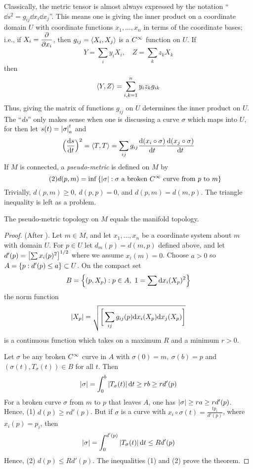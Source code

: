 \documentclass[../main]{subfiles}
\begin{document}
Classically, the metric tensor is almost always expressed by the notation \newline ``$\dd s^2 = g_{ij}\dd x_i\dd x_j$''. This means one is giving the inner product on a coordinate domain $U$ with coordinate functions $x_1,\ldots,x_n$ in terms of the coordinate bases; i.e., if $X_i=\dfrac{\partial }{\partial x_i}$, then $g_{ij}=\left\langle X_i,X_j\right\rangle$ is a $C^\infty$ function on $U$. If
\[Y=\sum_i y_iX_i,
\quad Z=\sum_k z_kX_k\]
then
\[\left\langle Y,Z\right\rangle = \sum_{i,k=1}^n y_iz_kg_{ik}\]
Thus, giving the matrix of functions $g_{ij}$ on $U$ determines the inner product on $U$. The ``\emph{ds}'' only makes sense when one is discussing a curve $\sigma$ which maps into $U$, for then let $s(t)=\left|\sigma\right|_a^t$ and
\[\Big(\dfrac{\mathrm{d}s}{\mathrm{d}t}\Big)^2 = \left\langle T,T\right\rangle = \sum_{ij} g_{ij}\dfrac{\mathrm{d}(x_i\circ\sigma)}{\mathrm{d}t}\dfrac{\mathrm{d}(x_j\circ\sigma)}{\mathrm{d}t}\]
If $M$ is connected, a \emph{pseudo-metric} is defined on $M$ by
\begin{equation}\tag{2} \label{eqn:ch6.1.2}
    d(p,m) = \inf\left\{\left|\sigma\right|:\sigma\text{ a broken $C^\infty$ curve from $p$ to $m$}\right\}
\end{equation}
Trivially, $d(p,m)\ge0,~d(p,p)=0$, and $d(p,m)=d(m,p)$. The triangle inequality is left as a problem.\\



\begin{theorem} \label{thm:ch6.1.1}
The pseudo-metric topology on $M$ equals the manifold topology.
\end{theorem}

\begin{proof}
(After \cite[p. 44]{seifert1951variationsrechnung}). Let $m\in M$, and let $x_1,\ldots,x_n$ be a coordinate system about $m$ with domain $U$. For $p\in U$ let $d_m(p)=d(m,p)$ defined above, and let $d'(p)=\left[\sum x_i(p)^2\right]^{1/2}$ where we assume $x_i(m)=0$. Choose $a>0$ so $A = \left\{p:d'(p)\le a\right\} \subset U$. On the compact set
\[B = \left\{(p,X_p):p\in A,~1=\sum \mathrm{d}x_i(X_p)^2\right\}\]
the norm function
\[\left|X_p\right| = \sqrt{\bigg[\sum_{ij}g_{ij}(p)\mathrm{d}x_i(X_p)\mathrm{d}x_j(X_p)\bigg]}\]
is a continuous function which takes on a maximum $R$ and a minimum $r>0$.

Let $\sigma$ be any broken $C^\infty$ curve in $A$ with $\sigma(0)=m,~\sigma(b)=p$ and $(\sigma(t),T_\sigma(t))\in B$ for all $t$. Then
\[\left|\sigma\right| = \int_0^b \left|T_\sigma(t)\right|\mathrm{d}t
\ge rb \ge rd'(p)\]
For a broken curve $\sigma$ from $m$ to $p$ that leaves $A$, one has $\left|\sigma\right| \ge ra \ge rd'(p)$. Hence, (1) $d(p) \ge rd'(p)$. But if $\sigma$ is a curve with $x_i\circ\sigma(t)=\frac{tp_i}{d'(p)}$, where $x_i(p)=p_i$, then
\[\left|\sigma\right| = \int_0^{d'(p)} \left|T_\sigma(t)\right|\mathrm{d}t \le Rd'(p)\]
Hence, (2) $d(p) \le Rd'(p)$. The inequalities (1) and (2) prove the theorem.
\end{proof}
\end{document}
